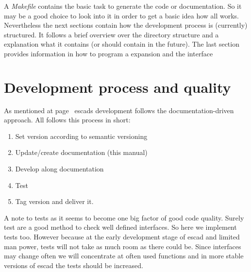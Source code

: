 \documentclass[a4paper, 12pt, openany]{scrbook}
\begin{document}
A \emph{Makefile} contains the basic task to generate the code or documentation. So it may be a good choice to look into it in order to get a basic idea how all works. Nevertheless the next sections contain how the development process is (currently) structured. It follows a brief overview over the directory structure and a explanation what it contains (or should contain in the future). The last section provides information in how to program a expansion and the interface
\section{Development process and quality}
As mentioned at page~\pageref{sec:ddd} escads development follows the documentation-driven approach.
All follows this process in short:
\begin{enumerate}
\item Set version according to semantic versioning \parencite{web:semver}
\item Update/create documentation (this manual)
\item Develop along documentation
\item Test
\item Tag version and deliver it.
\end{enumerate}
A note to tests as it seems to become one big factor of good code quality. Surely test are a good method to check well defined interfaces. So here we implement tests too. However because at the early development stage of escad and limited man power, tests will not take as much room as there could be. Since interfaces may change often we will concentrate at often used functions and in more stable versions of escad the tests should be increased.
\end{document}
